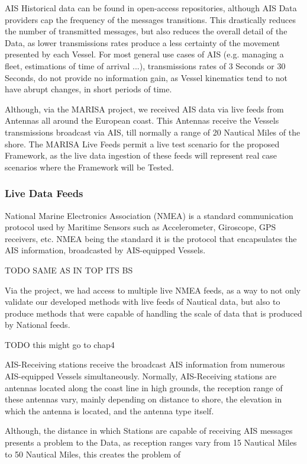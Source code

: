 AIS Historical data can be found in open-access repositories, although AIS Data providers cap the frequency of the messages transitions. This drastically reduces the number of transmitted messages, but also reduces the overall detail of the Data, as lower transmissions rates produce a less certainty of the movement presented by each Vessel. For most general use cases of AIS (e.g. managing a fleet, estimations of time of arrival ...), transmissions rates of 3 Seconds or 30 Seconds, do not provide no information gain, as Vessel kinematics tend to not have abrupt changes, in short periods of time. 

Although, via the MARISA project, we received AIS data via live feeds from Antennas all around the European coast. This Antennas receive the Vessels transmissions broadcast via AIS, till normally a range of 20 Nautical Miles of the shore. The MARISA Live Feeds permit a live test scenario for the proposed Framework, as the live data ingestion of these feeds will represent real case scenarios where the Framework will be Tested.

\subsubsection{Live Data Feeds}
National Marine Electronics Association (NMEA) is a standard communication protocol used by Maritime Sensors such as Accelerometer, Giroscope, GPS receivers, etc.
NMEA being the standard it is the protocol that encapsulates the AIS information, broadcasted by AIS-equipped Vessels. 

TODO SAME AS IN TOP ITS BS

Via the project, we had access to multiple live NMEA feeds, as a way to not only validate our developed methods with live feeds of Nautical data, but also to produce methods that were capable of handling the scale of data that is produced by National feeds.


TODO this might go to chap4

AIS-Receiving stations receive the broadcast AIS information from numerous AIS-equipped Vessels simultaneously. Normally, AIS-Receiving stations are antennas located along the coast line in high grounds, the reception range of these antennas vary, mainly depending on distance to shore, the elevation in which the antenna is located, and the antenna type itself.

Although, the distance in which Stations are capable of receiving AIS messages presents a problem to the Data, as reception ranges vary from 15 Nautical Miles to 50 Nautical Miles, this creates the problem of 

